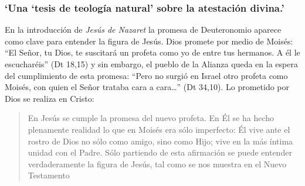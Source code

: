 \subsubsection{\enquote*{Una `tesis de teología natural' sobre la atestación divina.}}

En la introducción de \emph{Jesús de Nazaret} la promesa de Deuteronomio aparece como clave para entender la figura de Jesús. Dios promete por medio de Moisés: \enquote{El Señor, tu Dios, te suscitará un profeta como yo de entre tus hermanos. A él le escucharéis} (Dt 18,15) y sin embargo, el pueblo de la Alianza queda en la espera del cumplimiento de esta promesa: \enquote{Pero no surgió en Israel otro profeta como Moisés, con quien el Señor trataba cara a cara\ldots} (Dt 34,10). Lo prometido por Dios se realiza en Cristo: \blockquote[{\cite[28]{ratzinger2007jdenaz}}]{En Jesús se cumple la promesa del nuevo profeta. En Él se ha hecho plenamente realidad lo que en Moisés era sólo imperfecto: Él vive ante el rostro de Dios no sólo como amigo, sino como Hijo; vive en la más íntima unidad con el Padre. Sólo partiendo de esta afirmación se puede entender verdaderamente la figura de Jesús, tal como se nos muestra en el Nuevo Testamento}

